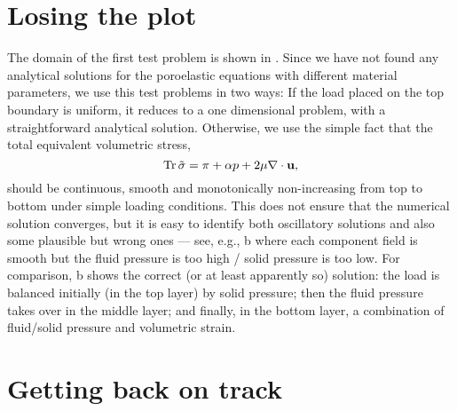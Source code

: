 \section{Losing the plot}

The domain of the first test problem is shown in .
Since we have not found any analytical solutions for the poroelastic equations
with different material parameters, we use this test problems in two ways: If
the load placed on the top boundary is uniform, it reduces to a one dimensional
problem, with a straightforward analytical solution.
Otherwise, we use the simple fact that the total equivalent volumetric stress,
\begin{equation}
\trace{\tilde{\sigma}} = \Ps + \alpha \Pf + 2\mu \nabla\cdot\U,
\end{equation}
should be continuous, smooth and monotonically non-increasing from top to bottom
under simple loading conditions.
This does not ensure that the numerical solution converges, but it is easy to
identify both oscillatory solutions and also some plausible but wrong ones
--- see, e.g., b where each component field is smooth
but the fluid pressure is too high / solid pressure is too low.
For comparison, b shows the correct (or at least
apparently so) solution: the load is balanced initially (in the top layer) by
solid pressure; then the fluid pressure takes over in the middle layer; and
finally, in the bottom layer, a combination of fluid/solid pressure and
volumetric strain.





\section{Getting back on track}

